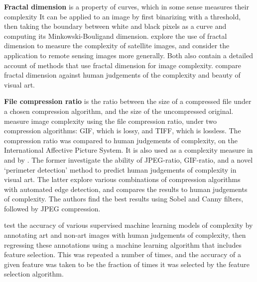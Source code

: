 \documentclass[a4paper,fleqn]{cas-sc}
\theoremstyle{remark}
\begin{document}
\textbf{Fractal dimension} is a property of curves, which in some sense measures their complexity 
It can be applied to an image by first binarizing with a threshold, then taking the boundary between white and black pixels as a curve and computing its Minkowski-Bouligand dimension. \citet{lam2002evaluation} explore the use of fractal dimension to measure the complexity of satellite images, and \citet{sun2006fractal} consider the application to remote sensing images more generally. Both also contain a detailed account of methods that use fractal dimension for image complexity. \citet{forsythe2011predicting} compare fractal dimension against human judgements of the complexity and beauty of visual art.

\textbf{File compression ratio} is the ratio between the size of a compressed file under a chosen compression algorithm, and the size of the uncompressed original. \citet{marin2013examining} measure image complexity using the file compression ratio, under two compression algorithms: GIF, which is lossy, and TIFF, which is lossless. The compression ratio was compared to human judgements of complexity, on the International Affective Picture System. It is also used as a complexity measure in \citet{forsythe2011predicting} and by \citet{machado2015computerized}. The former investigate the ability of JPEG-ratio, GIF-ratio, and a novel `perimeter detection' method to predict human judgements of complexity in visual art. The latter explore various combinations of compression algorithms with automated edge detection, and compares the results to human judgements of complexity. The authors find the best results using Sobel and Canny filters, followed by JPEG compression. 

\citet{carballal2020comparison} test the accuracy of various supervised machine learning models of complexity by annotating art and non-art images with human judgements of complexity, then regressing these annotations using a machine learning algorithm that includes feature selection. This was repeated a number of times, and the accuracy of a given feature was taken to be the fraction of times it was selected by the feature selection algorithm.
\end{document}
